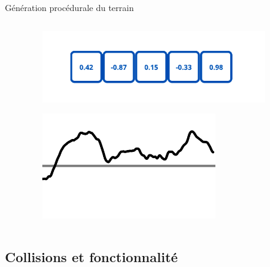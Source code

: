 \documentclass[aspectratio=169]{beamer}
\begin{document}
\begin{frame}{Génération procédurale du terrain}
    \begin{columns}
        \centering
        \begin{column}{0.5\textwidth}
            \centering
            \lipsum[1][1-5]
        \end{column}
        \begin{column}{0.5\textwidth}
            \centering
            \begin{figure}
                \centering
                \includegraphics[width=0.9\textwidth]{assets/tableau.png}
            \end{figure}
            \begin{figure}
                \centering
                \includegraphics[width=0.7\textwidth]{assets/PerlinNoise1d.png}
            \end{figure}
        \end{column}
    \end{columns}
\end{frame}

\subsection{Collisions et fonctionnalité}
\end{document}
